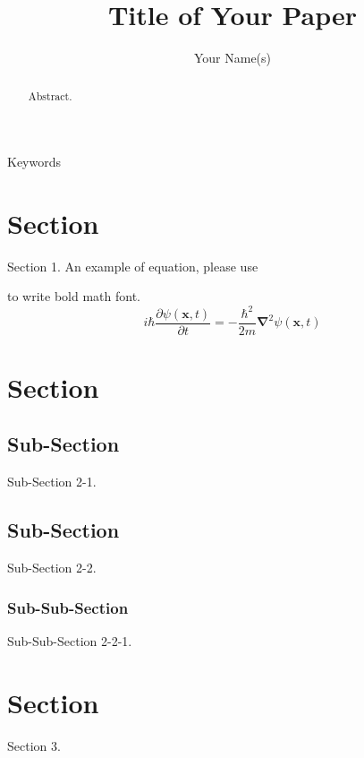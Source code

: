 \documentclass[publish,conference,paper]{conferencearticle}
\begin{document}
\pagestyle{conferencestyle}

\title{Title of Your Paper}
\author{Your Name(s)}
\address{Address(es) of Your Institute\\
         E-mail: Your E-mail address(es)}
\maketitle

\begin{abstract}%
\noindent Abstract. %
\end{abstract}

\begin{keywords}
Keywords
\end{keywords}


\section{Section}
Section 1.
%
An example of equation, please use \begin{verbatim*}\end{verbatim*} to write bold math font.
\begin{equation}
i \hbar \frac{\partial \psi (\bm{x},t)}{\partial  t} = -\frac{\hbar ^2}{2m}\bm{\nabla}^2 \psi ( \bm{x} , t )
\end{equation}

\section{Section}
\subsection{Sub-Section}
Sub-Section 2-1.

\subsection{Sub-Section}
Sub-Section 2-2.

\subsubsection{Sub-Sub-Section}
Sub-Sub-Section 2-2-1.

\section{Section}
Section 3.
\end{document}
